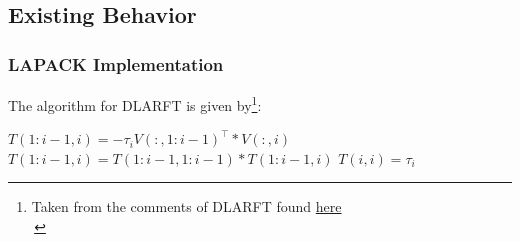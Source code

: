 \documentclass[12pt,aspectratio=169]{beamer}
\begin{document}
    \subsection{Existing Behavior}
    \begin{frame}
        \frametitle{LAPACK Implementation}
        The algorithm for DLARFT is given by\footnote{Taken from the comments of DLARFT found \textcolor{blue}{\href{https://netlib.org/lapack/explore-html//dd/daa/dlarft_8f_source.html}{here}}\\\,}:
        \begin{algorithmic}[1]
                \State $T(1:i-1,i) = -\tau_i V(:,1:i-1)^\top * V(:,i)$
                \State $T(1:i-1,i) = T(1:i-1,1:i-1) * T(1:i-1,i)$
                \State $T(i,i) = \tau_i$
            \EndFor
        \end{algorithmic}

    \end{frame}
\end{document}
